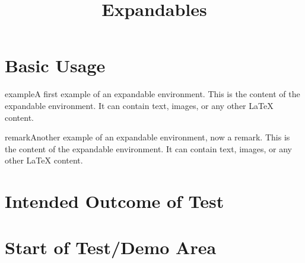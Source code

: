 \documentclass{ximera}
\title{Expandables}
\begin{document}
\begin{abstract}
\end{abstract}
\maketitle

\section{Basic Usage}

\begin{expandable}{example}{A first example of an expandable environment.}
This is the content of the expandable environment. It can contain text, images, or any other LaTeX content.
\end{expandable}

\begin{expandable}{remark}{Another example of an expandable environment, now a remark.}
This is the content of the expandable environment. It can contain text, images, or any other LaTeX content.
\end{expandable}

\section{Intended Outcome of Test}

\section{Start of Test/Demo Area}
\end{document}
